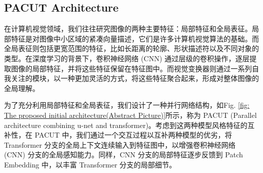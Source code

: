 \documentclass[a4paper, 10pt]{article}
\begin{document}
		\subsection{PACUT Architecture}
		
		在计算机视觉领域，我们往往研究图像的两种主要特征：局部特征和全局表征。局部特征\cite{jain1991unsupervised}\cite{lowe2004distinctive}\cite{ojala2002multiresolution}是对图像中小区域的紧凑向量描述，它们是许多计算机视觉算法的基础。而全局表征则包括更宽范围的特征，比如长距离的轮廓\cite{lisin2005combining}、形状描述符以及不同对象的类型。在深度学习的背景下，卷积神经网络 (CNN) 通过层级的卷积操作，逐层提取图像的局部特征，并将这些特征保留在特征图中。而视觉变换器则通过一系列自我关注的模块，以一种更加灵活的方式，将这些特征聚合起来，形成对整体图像的全局理解。
		
		为了充分利用局部特征和全局表征，我们设计了一种并行网络结构，如Fig. \ref{fig: The proposed initial architecture(Abstract Picture)}所示，称为 PACUT (Parallel architecture combining u-net and transformer)。考虑到这两种模型风格特征的互补性，在 PACUT 中，我们通过一个交互过程以互补两种模型的优劣，将 Transformer 分支的全局上下文连续输入到特征图中，以增强卷积神经网络 (CNN) 分支的全局感知能力。同样，CNN 分支的局部特征逐步反馈到 Patch Embedding 中，以丰富 Transformer 分支的局部细节。
		
\end{document}
